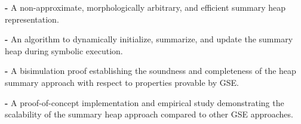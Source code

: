 


\begin{compactdesc}


\item\textbf{-} A non-approximate, morphologically arbitrary, and efficient 
summary heap representation.

\item\textbf{-} An algorithm to dynamically initialize, summarize, and
  update the summary heap during symbolic execution.

\item\textbf{-} A bisimulation proof establishing the soundness and 
completeness of the heap summary approach with respect to
properties provable by GSE.

\item\textbf{-} A proof-of-concept implementation and empirical study 
demonstrating the scalability of the summary heap approach
compared to other GSE approaches.

\end{compactdesc}


%
%
%
%
%
%




